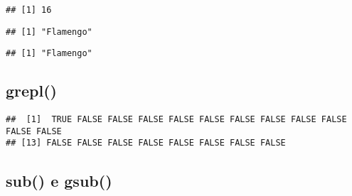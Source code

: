\documentclass[
]{book}
\newenvironment{Shaded}{\begin{snugshade}}{\end{snugshade}}
\newcommand{\AttributeTok}[1]{\textcolor[rgb]{0.77,0.63,0.00}{#1}}
\newcommand{\CommentTok}[1]{\textcolor[rgb]{0.56,0.35,0.01}{\textit{#1}}}
\newcommand{\ConstantTok}[1]{\textcolor[rgb]{0.00,0.00,0.00}{#1}}
\newcommand{\DecValTok}[1]{\textcolor[rgb]{0.00,0.00,0.81}{#1}}
\newcommand{\FloatTok}[1]{\textcolor[rgb]{0.00,0.00,0.81}{#1}}
\newcommand{\FunctionTok}[1]{\textcolor[rgb]{0.00,0.00,0.00}{#1}}
\newcommand{\NormalTok}[1]{#1}
\newcommand{\SpecialCharTok}[1]{\textcolor[rgb]{0.00,0.00,0.00}{#1}}
\newcommand{\StringTok}[1]{\textcolor[rgb]{0.31,0.60,0.02}{#1}}
\begin{document}
\begin{verbatim}
## [1] 16
\end{verbatim}

\begin{Shaded}
\end{Shaded}

\begin{verbatim}
## [1] "Flamengo"
\end{verbatim}

\begin{Shaded}
\end{Shaded}

\begin{verbatim}
## [1] "Flamengo"
\end{verbatim}

\hypertarget{grepl}{%
\subsection{grepl()}\label{grepl}}

\begin{Shaded}
\end{Shaded}

\begin{verbatim}
##  [1]  TRUE FALSE FALSE FALSE FALSE FALSE FALSE FALSE FALSE FALSE FALSE FALSE
## [13] FALSE FALSE FALSE FALSE FALSE FALSE FALSE FALSE
\end{verbatim}

\hypertarget{sub-e-gsub}{%
\subsection{sub() e gsub()}\label{sub-e-gsub}}
\end{document}
